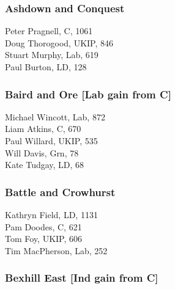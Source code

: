 \documentclass[a4paper,openany,10pt]{book}
\begin{document}
\subsubsection*{Ashdown and Conquest}



Peter Pragnell, C, 1061\\
Doug Thorogood, UKIP, 846\\
Stuart Murphy, Lab, 619\\
Paul Burton, LD, 128\\


\subsubsection*{Baird and Ore \hspace*{\fill}\nolinebreak[1]%
\enspace\hspace*{\fill}
[Lab gain from C]}



Michael Wincott, Lab, 872\\
Liam Atkins, C, 670\\
Paul Willard, UKIP, 535\\
Will Davis, Grn, 78\\
Kate Tudgay, LD, 68\\


\subsubsection*{Battle and Crowhurst}



Kathryn Field, LD, 1131\\
Pam Doodes, C, 621\\
Tom Foy, UKIP, 606\\
Tim MacPherson, Lab, 252\\


\subsubsection*{Bexhill East \hspace*{\fill}\nolinebreak[1]%
\enspace\hspace*{\fill}
[Ind gain from C]}
\end{document}
